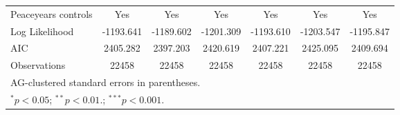 \begin{table}[htbp]
\begin{tabular}{l*{6}{c}}
Peaceyears controls &         Yes         &         Yes         &         Yes         &         Yes         &         Yes         &         Yes         \\
Log Likelihood      &   -1193.641         &   -1189.602         &   -1201.309         &   -1193.610         &   -1203.547         &   -1195.847         \\
AIC                 &    2405.282         &    2397.203         &    2420.619         &    2407.221         &    2425.095         &    2409.694         \\
Observations        &       22458         &       22458         &       22458         &       22458         &       22458         &       22458         \\
\hline\hline
\multicolumn{7}{l}{\footnotesize AG-clustered standard errors in parentheses.}\\
\multicolumn{7}{l}{\footnotesize $^{*}p<0.05$; $^{**}p<0.01.$; $^{***}p<0.001.$ }\\
\end{tabular}
\end{table}
